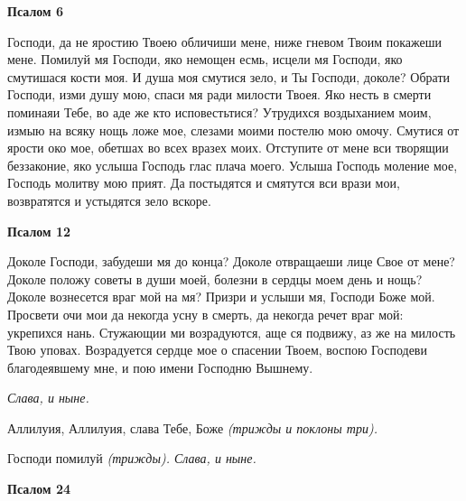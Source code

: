  

\bfseries Псалом 6\normalfont{}


   Господи, да не яростию Твоею обличиши мене, ниже гневом Твоим
покажеши мене. Помилуй мя Господи, яко немощен есмь, исцели мя Господи,
яко смутишася кости моя. И душа моя смутися зело, и Ты Господи, доколе?
Обрати Господи, изми душу мою, спаси мя ради милости Твоея. Яко несть
в смерти поминаяи Тебе, во аде же кто исповестьтися? Утрудихся
воздыханием моим, измыю на всяку нощь ложе мое, слезами моими постелю
мою омочу. Смутися от ярости око мое, обетшах во всех вразех моих.
Отступите от мене вси творящии беззаконие, яко услыша Господь глас плача
моего. Услыша Господь моление мое, Господь молитву мою прият. Да
постыдятся и смятутся вси врази мои, возвратятся и устыдятся зело
вскоре.






 

\bfseries Псалом 12\normalfont{}


   Доколе Господи, забудеши мя до конца? Доколе отвращаеши лице Свое
от мене? Доколе положу советы в души моей, болезни в сердцы моем день и
нощь? Доколе вознесется враг мой на мя? Призри и услыши мя, Господи
Боже мой. Просвети очи мои да некогда усну в смерть, да некогда речет враг
мой: укрепихся нань. Стужающии ми возрадуются, аще ся подвижу,
аз же на милость Твою уповах. Возрадуется сердце мое о спасении
Твоем, воспою Господеви благодеявшему мне, и пою имени Господню
Вышнему.



 \itshape Слава, и ныне\normalfont{}.


   Аллилуия, Аллилуия, слава Тебе, Боже \itshape (трижды и поклоны три)\normalfont{}.


   Господи помилуй \itshape (трижды)\normalfont{}. \itshape Слава, и ныне\normalfont{}.






 

\bfseries Псалом 24\normalfont{}


